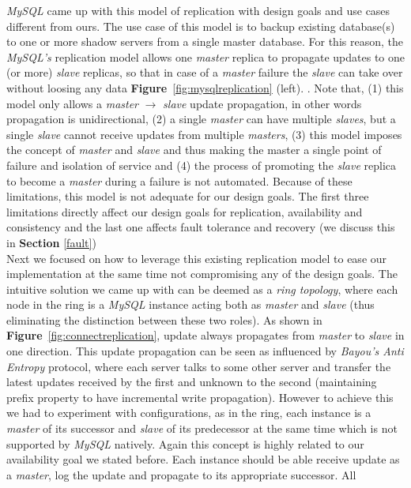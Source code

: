 \documentclass[12pt]{article}
\begin{document}
\emph{MySQL} came up with this model of replication with design goals and use cases different from ours. 
The use case of this model is to backup existing database(s) to one or more shadow servers
from a single master database. For this reason, the \emph{MySQL's} replication
model allows one \emph{master} replica to propagate updates to one (or more)
\emph{slave} replicas, so that in case of a \emph{master} failure the
\emph{slave} can take over without loosing any data
\textbf{Figure}~\ref{fig:mysqlreplication} (left). . Note that,  (1) this model
only allows a \emph{master} $\rightarrow$ \emph{slave} update propagation, in
other words propagation is unidirectional, (2) a single \emph{master} can have
multiple \emph{slaves}, but a single \emph{slave} cannot receive updates from
multiple \emph{masters}, (3) this model imposes the concept of \emph{master} and
\emph{slave} and thus making the master a single point of failure and isolation
of service and (4) the process of promoting the \emph{slave} replica to become a
\emph{master} during a failure is not automated. Because of these limitations,
this model is not adequate for our design goals. The first three limitations
directly affect our design goals for replication, availability and consistency
and the last one affects fault tolerance and recovery (we discuss this in
\textbf{Section} \ref{fault})\\ Next we focused on how to leverage this existing
replication model to ease our implementation at the same time not compromising
any of the design goals. The intuitive  solution we came up with can be deemed
as a \emph{ring topology}, where each node in the ring is a \emph{MySQL}
instance acting both as \emph{master} and \emph{slave} (thus eliminating the
distinction between these two roles). As shown in
\textbf{Figure}~\ref{fig:connectreplication}, update always propagates from
\emph{master} to \emph{slave} in one direction. This update propagation can be
seen as influenced by \emph{Bayou's Anti Entropy} protocol, where each server
talks to some other server and transfer the latest updates received by the first
and unknown to the second (maintaining prefix property to have incremental write
propagation). However to achieve this we had to experiment with configurations,
as in the ring, each instance is a \emph{master} of its successor and
\emph{slave} of its predecessor at the same time which is not supported by
\emph{MySQL} natively. Again this concept is highly related to our availability
goal we stated before. Each instance should be able receive update as a
\emph{master}, log the update and propagate to its appropriate successor. All
\end{document}
